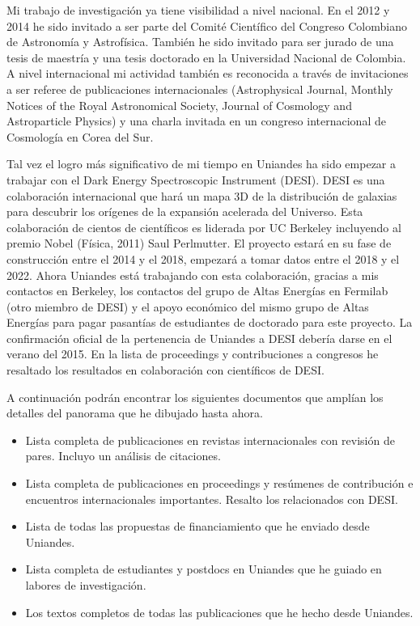 \documentclass[letterpaper,12pt,onecolumn]{article}
\begin{document}
Mi trabajo de investigaci\'on ya tiene visibilidad a nivel nacional. En
el 2012 y 2014 he sido invitado a ser parte del Comit\'e Cient\'ifico del
Congreso Colombiano de Astronom\'ia y Astrof\'isica. Tambi\'en he sido
invitado para ser jurado de una tesis de maestr\'ia y una tesis
doctorado en la Universidad Nacional de Colombia.  A nivel
internacional mi actividad tambi\'en es reconocida a trav\'es de
invitaciones a ser referee de publicaciones internacionales
(Astrophysical Journal, Monthly Notices of the Royal Astronomical
Society, Journal of Cosmology and Astroparticle Physics) y una charla
invitada en un congreso internacional de Cosmolog\'ia en Corea del Sur.    


Tal vez el logro m\'as significativo de mi tiempo en Uniandes ha sido
empezar a trabajar con el Dark Energy Spectroscopic Instrument (DESI). DESI
es una colaboraci\'on internacional que har\'a un mapa 3D de la
distribuci\'on de galaxias para descubrir los or\'igenes de la expansi\'on
acelerada del Universo. Esta colaboraci\'on de cientos de cient\'ificos es
liderada por UC Berkeley incluyendo al premio Nobel (F\'isica, 2011)
Saul Perlmutter. El proyecto estar\'a en su fase de construcci\'on entre el
2014 y el 2018, empezar\'a a tomar datos entre el 2018 y el 2022. Ahora
Uniandes est\'a trabajando con esta colaboraci\'on, gracias a mis
contactos en Berkeley, los contactos del grupo de Altas Energ\'ias en
Fermilab (otro miembro de DESI) y el apoyo econ\'omico del mismo grupo
de Altas Energ\'ias para pagar pasant\'ias de estudiantes de doctorado
para este proyecto. La confirmaci\'on oficial de la pertenencia de
Uniandes a DESI deber\'ia darse en el verano del 2015. En la lista de
proceedings y contribuciones a congresos he resaltado los resultados
en colaboraci\'on con cient\'ificos de DESI.

A continuaci\'on podr\'an encontrar los siguientes documentos que
ampl\'ian los detalles del panorama que he dibujado hasta ahora.

\begin{itemize}
\item Lista completa de publicaciones en revistas internacionales
  con revisi\'on de pares. Incluyo un an\'alisis de citaciones.
\item Lista completa de publicaciones en proceedings y res\'umenes de
  contribuci\'on e encuentros internacionales importantes. Resalto los
  relacionados con DESI.
\item Lista de todas las propuestas de financiamiento que he enviado
  desde Uniandes.
\item Lista completa de estudiantes y postdocs en Uniandes que he guiado
  en labores de investigaci\'on. 
\item Los textos completos de todas las publicaciones que he hecho desde
  Uniandes.
\end{itemize}
\end{document}

